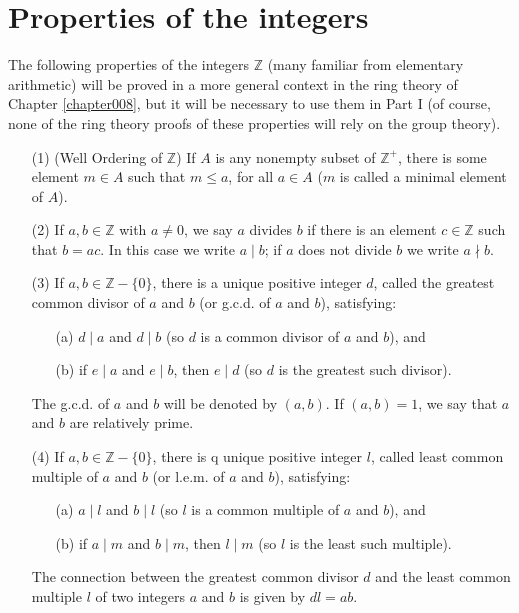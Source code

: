 \documentclass[cn,11pt,chinese]{elegantbook}
\numberwithin{equation}{section}
\begin{document}
\section{Properties of the integers}\label{section00002}
The following properties of the integers $\mathbb{Z}$ (many familiar from elementary arithmetic) will be proved in a more general context in the ring theory of Chapter \ref{chapter008}, but it will be necessary to use them in Part I (of course, none of the ring theory proofs of these properties will rely on the group theory).

\begin{enumerate}
\item[(1)] (Well Ordering of $\mathbb{Z}$) If $A$ is any nonempty subset of $\mathbb{Z}^+$, there is some element $m \in A$ such that $m \le a$, for all $a \in A$ ($m$ is called a minimal element of $A$).

\item[(2)] If $a, b \in \mathbb{Z}$ with $a \neq 0$, we say $a$ divides $b$ if there is an element $c \in \mathbb{Z}$ such that $b=ac$. In this case we write $a \mid b$; if $a$ does not divide $b$ we write $a \nmid b$.

\item[(3)] If $a, b \in \mathbb{Z} - \{0\}$, there is a unique positive integer $d$, called the greatest common divisor of $a$ and $b$ (or g.c.d.  of $a$ and $b$), satisfying:
\begin{enumerate}
\item[(a)] $d \mid a$ and $d \mid b$ (so $d$ is a common divisor of $a$ and $b$), and
\item[(b)] if $e \mid a$ and $e \mid b$, then $e \mid d$ (so $d$ is the greatest such divisor).
\end{enumerate}
The g.c.d. of $a$ and $b$ will be denoted by $(a, b)$. If $(a, b) = 1$, we say that $a$ and $b$ are relatively prime.

\item[(4)] If $a, b \in \mathbb{Z} - \{0\}$, there is q unique positive integer $l$, called least common multiple of $a$ and $b$ (or l.e.m. of $a$ and $b$), satisfying:
\begin{enumerate}
\item[(a)] $a \mid l$ and $b \mid l$ (so $l$ is a common multiple of $a$ and $b$), and
\item[(b)] if $a \mid m$ and $b \mid m$, then $l \mid m$ (so $l$ is the least such multiple).
\end{enumerate}
The connection between the greatest common divisor $d$ and the least common multiple $l$ of two integers $a$ and $b$ is given by $dl=ab$.


\end{enumerate}
\end{document}

